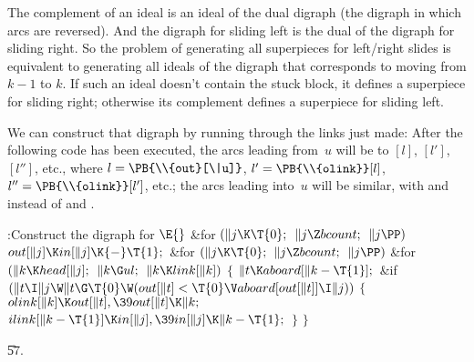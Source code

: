 The complement of an ideal is an ideal of the dual digraph (the digraph
in which arcs are reversed). And the digraph for sliding left is the
dual of the digraph for sliding right. So the problem of generating all
superpieces for left/right slides is equivalent to generating all ideals
of the digraph that corresponds to moving from $k-1$ to $k$.
If such an ideal doesn't contain the stuck block, it defines a superpiece for
sliding right; otherwise its complement defines a superpiece for sliding left.

We can construct that digraph by running through the links just made:
After the following code has been executed, the arcs leading from~$u$ will
be to $[l]$, $[l']$, $[l'']$,
etc., where
$l=\PB{\\{out}[\|u]}$, $l'=\PB{\\{olink}}[l]$, $l''=\PB{\\{olink}}[l']$, etc.;
the arcs leading
into~$u$ will be similar, with  and  instead of  and .

\Y\B\4:Construct the digraph for \X${}\E{}$\6
\&{for} ${}(\|j\K\T{0};{}$ ${}\|j\Z\\{bcount};{}$ ${}\|j\PP){}$\1\5
${}\\{out}[\|j]\K\\{in}[\|j]\K{-}\T{1};{}$\2\6
\&{for} ${}(\|j\K\T{0};{}$ ${}\|j\Z\\{bcount};{}$ ${}\|j\PP){}$\1\6
\&{for} ${}(\|k\K\\{head}[\|j];{}$ ${}\|k\G\\{ul};{}$ ${}\|k\K\\{link}[\|k]){}$%
\5
${}\{{}$\1\6
${}\|t\K\\{aboard}[\|k-\T{1}];{}$\6
\&{if} ${}(\|t\I\|j\W\|t\G\T{0}\W(\\{out}[\|t]<\T{0}\V\\{aboard}[\\{out}[\|t]]%
\I\|j)){}$\5
${}\{{}$\1\6
${}\\{olink}[\|k]\K\\{out}[\|t],\39\\{out}[\|t]\K\|k;{}$\6
${}\\{ilink}[\|k-\T{1}]\K\\{in}[\|j],\39\\{in}[\|j]\K\|k-\T{1};{}$\6
\4${}\}{}$\2\6
\4${}\}{}$\2\2\par
\U57.\fi

